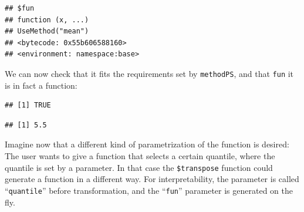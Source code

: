 \documentclass[
]{scrbook}
\newenvironment{Shaded}{\begin{snugshade}}{\end{snugshade}}
\newcommand{\AttributeTok}[1]{\textcolor[rgb]{0.77,0.63,0.00}{#1}}
\newcommand{\CommentTok}[1]{\textcolor[rgb]{0.56,0.35,0.01}{\textit{#1}}}
\newcommand{\ControlFlowTok}[1]{\textcolor[rgb]{0.13,0.29,0.53}{\textbf{#1}}}
\newcommand{\DecValTok}[1]{\textcolor[rgb]{0.00,0.00,0.81}{#1}}
\newcommand{\FunctionTok}[1]{\textcolor[rgb]{0.00,0.00,0.00}{#1}}
\newcommand{\NormalTok}[1]{#1}
\newcommand{\OtherTok}[1]{\textcolor[rgb]{0.56,0.35,0.01}{#1}}
\newcommand{\SpecialCharTok}[1]{\textcolor[rgb]{0.00,0.00,0.00}{#1}}
\newcommand{\StringTok}[1]{\textcolor[rgb]{0.31,0.60,0.02}{#1}}
\renewenvironment{Shaded} {\begin{snugshade}\small} {\end{snugshade}}
\begin{document}
\begin{verbatim}
## $fun
## function (x, ...) 
## UseMethod("mean")
## <bytecode: 0x55b606588160>
## <environment: namespace:base>
\end{verbatim}

We can now check that it fits the requirements set by \texttt{methodPS}, and that \texttt{fun} it is in fact a function:

\begin{Shaded}
\end{Shaded}

\begin{verbatim}
## [1] TRUE
\end{verbatim}

\begin{Shaded}
\end{Shaded}

\begin{verbatim}
## [1] 5.5
\end{verbatim}

Imagine now that a different kind of parametrization of the function is desired:
The user wants to give a function that selects a certain quantile, where the quantile is set by a parameter.
In that case the \texttt{\$transpose} function could generate a function in a different way.
For interpretability, the parameter is called ``\texttt{quantile}'' before transformation, and the ``\texttt{fun}'' parameter is generated on the fly.

\begin{Shaded}
\end{Shaded}
\end{document}
